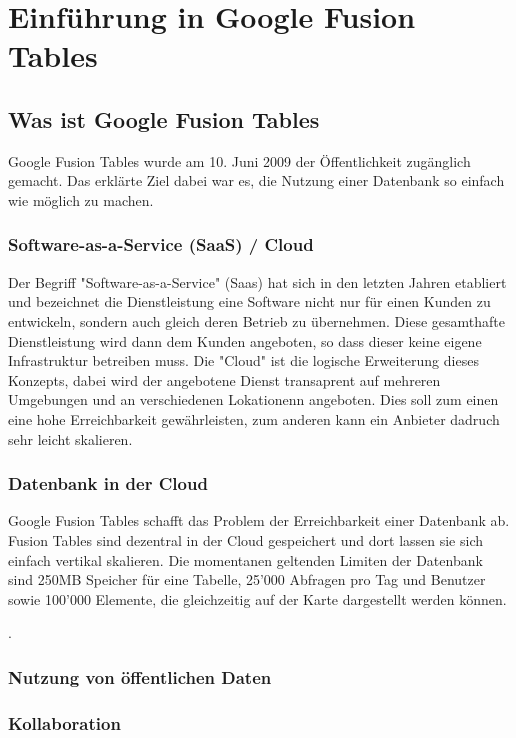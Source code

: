\chapter{Einführung in Google Fusion Tables}

\section{Was ist Google Fusion Tables}
Google Fusion Tables wurde am 10. Juni 2009 der Öffentlichkeit zugänglich gemacht\cite{fusion-table-announce}. Das erklärte Ziel dabei war es, die Nutzung einer Datenbank so einfach wie möglich zu machen.

\subsection{Software-as-a-Service (SaaS) / Cloud}
Der Begriff "Software-as-a-Service" (Saas) hat sich in den letzten Jahren etabliert und bezeichnet die Dienstleistung eine Software nicht nur für einen Kunden zu entwickeln, sondern auch gleich deren Betrieb zu übernehmen. Diese gesamthafte Dienstleistung wird dann dem Kunden angeboten, so dass dieser keine eigene Infrastruktur betreiben muss. Die "Cloud" ist die logische  Erweiterung dieses Konzepts, dabei wird der angebotene Dienst transaprent auf mehreren Umgebungen und an verschiedenen Lokationenn angeboten. Dies soll zum einen eine hohe Erreichbarkeit gewährleisten, zum anderen kann ein Anbieter dadruch sehr leicht skalieren. 

\subsection{Datenbank in der Cloud}
Google Fusion Tables schafft das Problem der Erreichbarkeit einer Datenbank ab. Fusion Tables sind dezentral in der Cloud gespeichert und dort lassen sie sich einfach vertikal skalieren. Die momentanen geltenden Limiten der Datenbank sind 250MB Speicher für eine Tabelle, 25'000 Abfragen pro Tag und Benutzer sowie 100'000 Elemente, die gleichzeitig auf der Karte dargestellt werden können.

. 

\subsection{Nutzung von öffentlichen Daten}

\subsection{Kollaboration}

